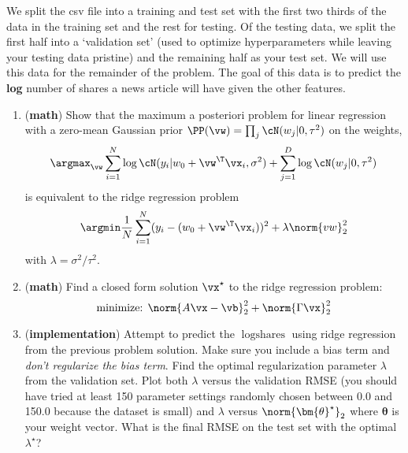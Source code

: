 \documentclass[189]{pset}
\begin{document}
    We split the csv file into a training and test set with the first
    two thirds of the data in the training set and the rest for
    testing. Of the testing data, we split the first half into a
    `validation set' (used to optimize hyperparameters while leaving
    your testing data pristine) and the remaining half as your test
    set. We will use this data for the remainder of the problem. The
    goal of this data is to predict the \textbf{log} number of shares
    a news article will have given the other features.

  \begin{enumerate}
    \item (\textbf{math}) Show that the maximum a posteriori problem
      for linear regression with a zero-mean Gaussian prior $\PP(\vw)
      = \prod_j \cN(w_j | 0, \tau^2)$ on the weights,
      \[
        \argmax_\vw \sum_{i=1}^N \log\cN(y_i | w_0 + \vw^\T\vx_i,
        \sigma^2) + \sum_{j=1}^D \log\cN(w_j | 0, \tau^2)
      \]
      is equivalent to the ridge regression problem
      \[
        \argmin \frac{1}{N}\sum_{i=1}^N (y_i - (w_0 + \vw^\T\vx_i))^2
        + \lambda \norm{vw}_2^2
      \]
      with $\lambda = \sigma^2 / \tau^2$.

    \item (\textbf{math}) Find a closed form solution $\vx^\star$ to
      the ridge regression problem:
    \[
      \text{minimize: } \norm{A\vx - \vb}_2^2 + \norm{\Gamma \vx}_2^2
    \]

  \item (\textbf{implementation}) Attempt to predict the
    $\log\text{shares}$ using ridge regression from the previous
    problem solution. Make sure you include a bias term and
    \textit{don't regularize the bias term}. Find the optimal
    regularization parameter $\lambda$ from the validation set. Plot
    both $\lambda$ versus the validation RMSE (you should have tried
    at least 150 parameter settings randomly chosen between 0.0 and
    150.0 because the dataset is small) and $\lambda$ versus
    $\norm{\bm{\theta}^\star}_2$ where $\bm{\theta}$ is your weight
    vector. What is the final RMSE on the test set with the optimal
    $\lambda^\star$?


\end{enumerate}
\end{document}

